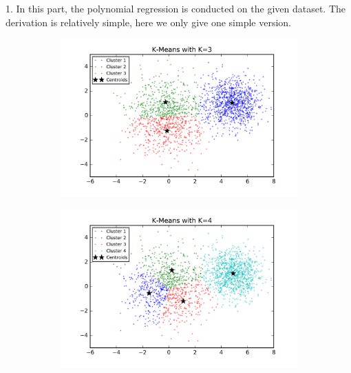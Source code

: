 \begin{description}

\item{1. }
In this part, the polynomial regression is conducted on the given dataset. The derivation is relatively simple, here we only give one simple version.

\begin{figure}[htb]
        \centering
        \begin{subfigure}[b]{0.475\textwidth}
            \centering
            \includegraphics[width=\textwidth]{./figures/clustering_kMeans_3.png}
        \end{subfigure}
        \hfill
        \begin{subfigure}[b]{0.475\textwidth}  
            \centering 
            \includegraphics[width=\textwidth]{./figures/clustering_kMeans_4.png}

\end{subfigure}
\end{figure}
\end{description}
